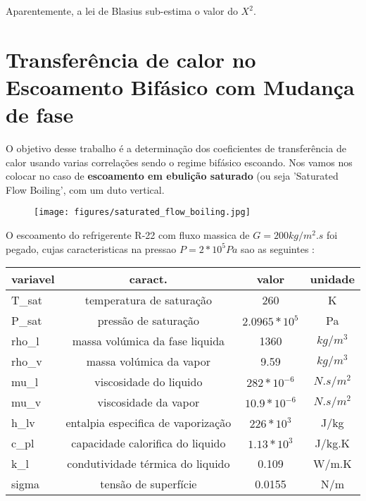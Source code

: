 \documentclass[a4paper, 11pt]{article}
\begin{document}
Aparentemente, a lei de Blasius sub-estima o valor do $X^2$.


\newpage
\section{Transferência de calor no Escoamento Bifásico com Mudança de fase}

O objetivo desse trabalho é a determinação dos coeficientes de transferência de calor usando varias correlações sendo o regime bifásico escoando.
Nos vamos nos colocar no caso de \textbf{escoamento em ebulição saturado} (ou seja 'Saturated Flow Boiling', com um duto vertical.

\begin{figure}[H]
  \begin{center}
  \texttt{[image: figures/saturated\_flow\_boiling.jpg]}  
\end{center} \end{figure}

O escoamento do refrigerente R-22 com fluxo massica de $G=200 kg/m^2.s$ foi pegado, cujas caracteristicas na pressao $P=2*10^5 Pa$ sao as seguintes :

\begin{center}
\begin{tabular}{lccc}
	\hline
    variavel & caract. & valor & unidade \\
    \hline
    T\_sat & temperatura de saturação & 260 & K \\
    P\_sat & pressão de saturação & $2.0965*10^5$ & Pa \\
    rho\_l & massa volúmica da fase liquida & 1360 & $kg/m^3$ \\
    rho\_v & massa volúmica da vapor & 9.59 & $kg/m^3$ \\
    mu\_l & viscosidade do liquido & $282*10^{-6}$ & $N.s/m^2$ \\
    mu\_v & viscosidade da vapor & $10.9*10^{-6}$ & $N.s/m^2$ \\
    h\_lv & entalpia especifica de vaporização & $226 * 10^3$ & J/kg \\
    c\_pl & capacidade calorifica do liquido & $1.13*10^3$ & J/kg.K \\
    k\_l & condutividade térmica do liquido & 0.109 & W/m.K \\
    sigma & tensão de superfície & 0.0155 & N/m \\
    \hline
\end{tabular}
\end{center}
\end{document}
